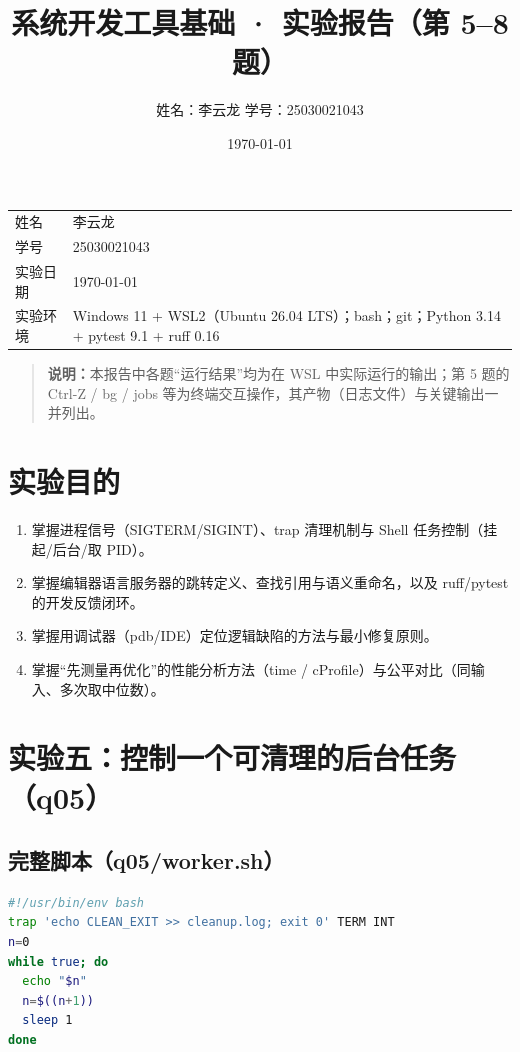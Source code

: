 \documentclass[UTF8,fontset=ubuntu]{ctexart}
\title{\textbf{系统开发工具基础 · 实验报告（第 5--8 题）}}
\author{姓名：李云龙 \quad 学号：25030021043}
\date{\today}
\begin{document}
\maketitle

\begin{center}
\begin{tabular}{@{}p{3cm}p{11.5cm}@{}}
\toprule
姓名 & 李云龙 \\
学号 & 25030021043 \\
实验日期 & \today \\
实验环境 & Windows 11 + WSL2（Ubuntu 26.04 LTS）；bash；git；Python 3.14 + pytest 9.1 + ruff 0.16 \\
\bottomrule
\end{tabular}
\end{center}

\begin{quote}
\textbf{说明：}本报告中各题“运行结果”均为在 WSL 中实际运行的输出；第 5 题的 Ctrl-Z / bg / jobs 等为终端交互操作，其产物（日志文件）与关键输出一并列出。
\end{quote}

\section{实验目的}
\begin{enumerate}
\item 掌握进程信号（SIGTERM/SIGINT）、trap 清理机制与 Shell 任务控制（挂起/后台/取 PID）。
\item 掌握编辑器语言服务器的跳转定义、查找引用与语义重命名，以及 ruff/pytest 的开发反馈闭环。
\item 掌握用调试器（pdb/IDE）定位逻辑缺陷的方法与最小修复原则。
\item 掌握“先测量再优化”的性能分析方法（time / cProfile）与公平对比（同输入、多次取中位数）。
\end{enumerate}

\section{实验五：控制一个可清理的后台任务（q05）}

\subsection{完整脚本（q05/worker.sh）}
\begin{lstlisting}[language=bash]
#!/usr/bin/env bash
trap 'echo CLEAN_EXIT >> cleanup.log; exit 0' TERM INT
n=0
while true; do
  echo "$n"
  n=$((n+1))
  sleep 1
done
\end{lstlisting}
\end{document}

